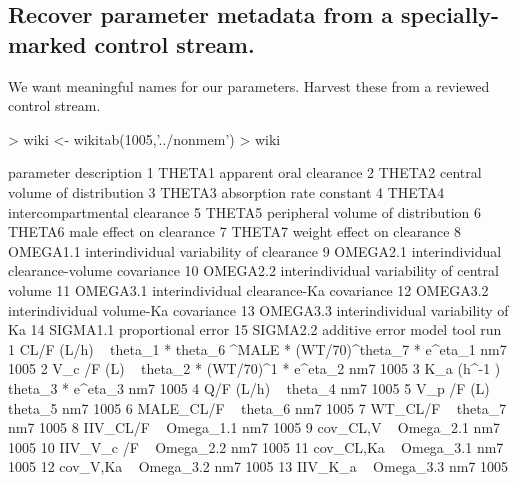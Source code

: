 \subsection{Recover parameter metadata from a specially-marked control stream.}
We want meaningful names for our parameters.  Harvest these from a reviewed control
stream.
\begin{Schunk}
\begin{Sinput}
> wiki <- wikitab(1005,'../nonmem')
> wiki
\end{Sinput}
\begin{Soutput}
   parameter                                   description
1     THETA1                       apparent oral clearance
2     THETA2                central volume of distribution
3     THETA3                      absorption rate constant
4     THETA4                  intercompartmental clearance
5     THETA5             peripheral volume of distribution
6     THETA6                      male effect on clearance
7     THETA7                    weight effect on clearance
8   OMEGA1.1      interindividual variability of clearance
9   OMEGA2.1   interindividual clearance-volume covariance
10  OMEGA2.2 interindividual variability of central volume
11  OMEGA3.1       interindividual clearance-Ka covariance
12  OMEGA3.2          interindividual volume-Ka covariance
13  OMEGA3.3             interindividual variability of Ka
14  SIGMA1.1                            proportional error
15  SIGMA2.2                                additive error
                                                                model tool  run
1  CL/F (L/h) ~ theta_1 *  theta_6 ^MALE * (WT/70)^theta_7  * e^eta_1  nm7 1005
2                          V_c /F (L) ~ theta_2 * (WT/70)^1 * e^eta_2  nm7 1005
3                                     K_a (h^-1 ) ~ theta_3 * e^eta_3  nm7 1005
4                                                 Q/F (L/h) ~ theta_4  nm7 1005
5                                                V_p /F (L) ~ theta_5  nm7 1005
6                                                 MALE_CL/F ~ theta_6  nm7 1005
7                                                   WT_CL/F ~ theta_7  nm7 1005
8                                                IIV_CL/F ~ Omega_1.1  nm7 1005
9                                                cov_CL,V ~ Omega_2.1  nm7 1005
10                                             IIV_V_c /F ~ Omega_2.2  nm7 1005
11                                             cov_CL,Ka  ~ Omega_3.1  nm7 1005
12                                              cov_V,Ka  ~ Omega_3.2  nm7 1005
13                                               IIV_K_a  ~ Omega_3.3  nm7 1005

\end{Soutput}
\end{Schunk}

